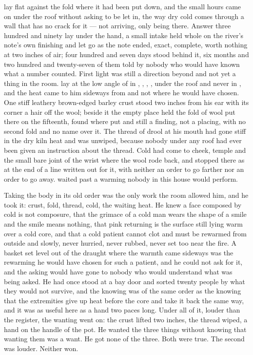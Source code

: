 
 lay flat against the fold where it had been put down, and the small hours came on under the roof without asking to be let in, the way dry cold comes through a wall that has no crack for it --- not arriving, only being there. Answer three hundred and ninety lay under the hand, a small intake held whole on the river's note's own finishing and let go as the note ended, exact, complete, worth nothing at two inches of air; four hundred and seven days stood behind it, six months and two hundred and twenty-seven of them told by nobody who would have known what a number counted. First light was still a direction beyond  and not yet a thing in the room.  lay at the low angle of  in , , , , under the roof and never in , and the heat came to him sideways from  and not where he would have chosen. One stiff leathery brown-edged barley crust stood two inches from his ear with its corner a hair off the wool; beside it the empty place held the fold of wool put there on the fifteenth, found where put and still a finding, not a placing, with no second fold and no name over it. The thread of drool at his mouth had gone stiff in the dry kiln heat and was unwiped, because nobody under any roof had ever been given an instruction about the thread. Cold had come to cheek, temple and the small bare joint of the wrist where the wool rode back, and stopped there as at the end of a line written out for it, with neither an order to go farther nor an order to go away.  waited past a warming nobody in this house would perform.

Taking the body in its old order was the only work the room allowed him, and he took it: crust, fold, thread, cold, the waiting heat. He knew a face composed by cold is not composure, that the grimace of a cold man wears the shape of a smile and the smile means nothing, that pink returning is the surface still lying warm over a cold core, and that a cold patient cannot clot and must be rewarmed from outside and slowly, never hurried, never rubbed, never set too near the fire. A basket set level out of the draught where the warmth came sideways was the rewarming he would have chosen for such a patient, and he could not ask for it, and the asking would have gone to nobody who would understand what was being asked. He had once stood at a bay door and sorted twenty people by what they would not survive, and the knowing was of the same order as the knowing that the extremities give up heat before the core and take it back the same way, and it was as useful here as a hand two paces long. Under all of it, louder than the register, the wanting went on: the crust lifted two inches, the thread wiped, a hand on the handle of the pot. He wanted the three things without knowing that wanting them was a want. He got none of the three. Both were true. The second was louder. Neither won.

